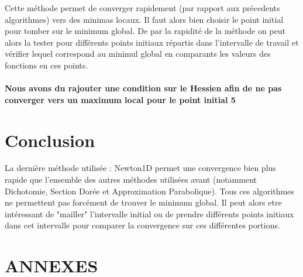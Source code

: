 \documentclass[twocolumn,10pt,a4paper]{article}
\begin{document}
Cette méthode permet de converger rapidement (par rapport aux précedents algorithmes) vers des minimas locaux. Il faut alors bien choisir le point initial pour tomber sur le minimum global. De par la rapidité de la méthode on peut alors la tester pour différents points initiaux répartis dans l'intervalle de travail et vérifier lequel correspond au minimul global en comparants les valeurs des fonctions en ces points.
\paragraph{Nous avons du rajouter une condition sur le Hessien afin de ne pas converger vers un maximum local pour le point initial 5}

\section*{Conclusion}
La dernière méthode utilisée : Newton1D permet une convergence bien plus rapide que l'ensemble des autres méthodes utilisées avant (notamment Dichotomie, Section Dorée et Approximation Parabolique). Tous ces algorithmes ne permettent pas forcément de trouver le minimum global. Il peut alors etre intéressant de "mailler" l'intervalle initial ou de prendre différents points initiaux dans cet intervalle pour comparer la convergence sur ces différentes portions.

\newpage
\newpage
\newpage
\section{ANNEXES}
\end{document}
